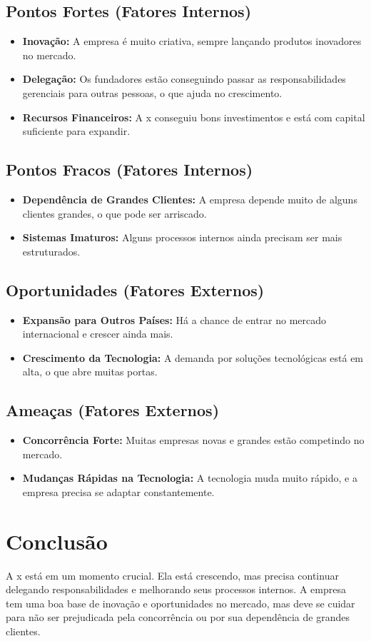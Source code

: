 \documentclass{article}
\begin{document}
	\subsection{Pontos Fortes (Fatores Internos)}
	\begin{itemize}
		\item \textbf{Inovação:} A empresa é muito criativa, sempre lançando produtos inovadores no mercado.
		\item \textbf{Delegação:} Os fundadores estão conseguindo passar as responsabilidades gerenciais para outras pessoas, o que ajuda no crescimento.
		\item \textbf{Recursos Financeiros:} A x conseguiu bons investimentos e está com capital suficiente para expandir.
	\end{itemize}
	
	\subsection{Pontos Fracos (Fatores Internos)}
	\begin{itemize}
		\item \textbf{Dependência de Grandes Clientes:} A empresa depende muito de alguns clientes grandes, o que pode ser arriscado.
		\item \textbf{Sistemas Imaturos:} Alguns processos internos ainda precisam ser mais estruturados.
	\end{itemize}
	
	\subsection{Oportunidades (Fatores Externos)}
	\begin{itemize}
		\item \textbf{Expansão para Outros Países:} Há a chance de entrar no mercado internacional e crescer ainda mais.
		\item \textbf{Crescimento da Tecnologia:} A demanda por soluções tecnológicas está em alta, o que abre muitas portas.
	\end{itemize}
	
	\subsection{Ameaças (Fatores Externos)}
	\begin{itemize}
		\item \textbf{Concorrência Forte:} Muitas empresas novas e grandes estão competindo no mercado.
		\item \textbf{Mudanças Rápidas na Tecnologia:} A tecnologia muda muito rápido, e a empresa precisa se adaptar constantemente.
	\end{itemize}
	
	\section{Conclusão}
	A x está em um momento crucial. Ela está crescendo, mas precisa continuar delegando responsabilidades e melhorando seus processos internos. A empresa tem uma boa base de inovação e oportunidades no mercado, mas deve se cuidar para não ser prejudicada pela concorrência ou por sua dependência de grandes clientes.
	
\end{document}
